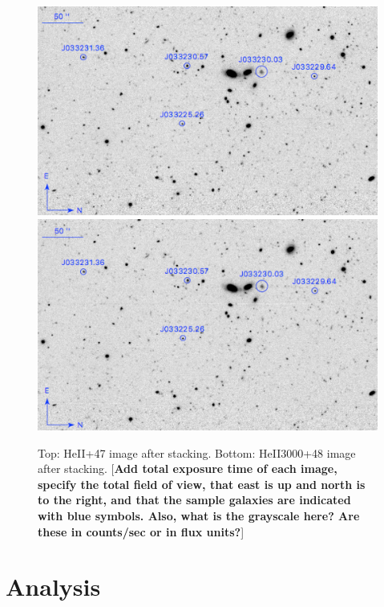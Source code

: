 \documentclass[twocolumn]{aastex6}
\begin{document}
\begin{figure}[ht!]
\centering
\includegraphics[scale=.61]{../Figures/HEII_final.png}
\includegraphics[scale=.61]{../Figures/HEII3000_final.png}
\caption{Top: HeII+47 image after stacking. Bottom: HeII3000+48 image after stacking. 
[{\bf Add total exposure time of each image, specify the total field of view, that east is up and north is to the right, and that the sample galaxies are indicated with blue symbols.  Also, what is the grayscale here?  Are these in counts/sec or in flux units?}]
}
\label{fig:stacked_image}
\end{figure}

\section{Analysis}
\end{document}
